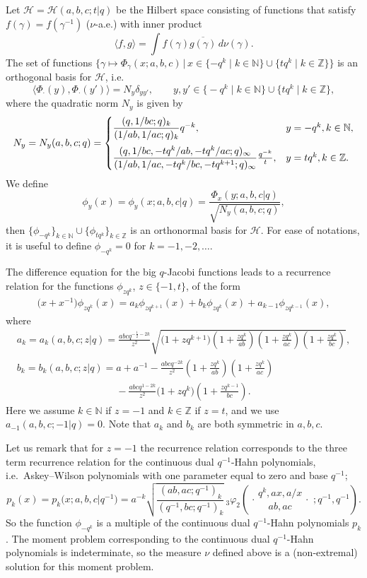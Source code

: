\documentclass[11pt]{article}
\numberwithin{equation}{section}
\numberwithin{theorem}{section}
\numberwithin{proposition}{section}
\numberwithin{lemma}{section}
\numberwithin{corollary}{section}
\numberwithin{definition}{section}
\numberwithin{example}{section}
\numberwithin{remark}{section}
\numberwithin{note}{section}
\newcommand{\N}{\mathbb N}
\newcommand{\Z}{\mathbb Z}
\newcommand{\rphis}[5]{\,_{#1}\varphi_{#2} \left( \genfrac{.}{.}{0pt}{}{#3}{#4}
\ ;#5 \right)}
\begin{document}
Let $\mathcal H=\mathcal H(a,b,c;t|q)$ be the Hilbert space consisting of functions that satisfy $f(\gamma)=f(\gamma^{-1})$ ($\nu$-a.e.) with inner product
\[
\langle f ,g \rangle = \int f(\gamma) \overline{g(\gamma)}\, d\nu(\gamma).
\]
The set of functions $\{\gamma \mapsto \Phi_\gamma(x;a,b,c)\, | \, x \in \{-q^k\mid k \in \N\}\cup\{tq^k\mid k \in \Z \}\}$ is an orthogonal basis for $\mathcal H$, i.e.
\[
\langle \Phi_\cdot(y), \Phi_\cdot(y') \rangle = N_y \delta_{yy'}, \qquad y,y' \in \big\{{-}q^k\mid k \in \N\big\}\cup\big\{tq^k \mid k \in \Z\big\},
\]
where the quadratic norm $N_y$ is given by
\[
N_y =N_y(a,b,c;q)= \begin{cases}
 \dfrac{ (q,1/bc;q)_k }{(1/ab,1/ac;q)_k}q^{-k}, & y=-q^k, k \in \N ,\vspace{2mm}\\
 \dfrac{ (q,1/bc,-tq^k/ab, -tq^k/ac;q)_\infty }{ (1/ab,1/ac,-tq^k/bc, -tq^{k+1};q)_\infty }\frac{q^{-k}}{t}, & y=tq^k, k \in \Z.
\end{cases}
\]
We def\/ine
\[
\phi_y(x)=\phi_y(x;a,b,c|q) = \frac{\Phi_x(y;a,b,c|q)}{\sqrt{N_y(a,b,c;q)}},
\]
then $\{ \phi_{-q^k} \}_{k \in \N} \cup \{\phi_{tq^k} \}_{k \in \Z}$ is an orthonormal basis for $\mathcal H$. For ease of notations, it is useful to def\/ine $\phi_{-q^k}=0$ for $k=-1,-2,\ldots$.

The dif\/ference equation for the big $q$-Jacobi functions leads to a recurrence relation for the functions $\phi_{zq^k}$, $z\in\{-1,t\}$, of the form
\begin{gather} \label{eq:3termrecphi}
\big(x+x^{-1}\big)\phi_{zq^k}(x) = a_k \phi_{zq^{k+1}}(x) + b_k \phi_{zq^k}(x) + a_{k-1}\phi_{zq^{k-1}}(x),
\end{gather}
where
\begin{gather*}
a_k =a_k(a,b,c;z|q)=  \frac{ abcq^{-\frac12-2k} }{z^2} \sqrt{ \big(1+ zq^{k+1} \big) \left(1+\frac{ zq^k}{ab} \right) \left(1+\frac{zq^k}{ac} \right) \left(1+\frac{zq^k}{bc} \right) },\\
b_k =b_k(a,b,c;z|q)=  a+a^{-1} -\frac{abcq^{-2k}}{z^2}\left( 1+ \frac{zq^k}{ab} \right) \left( 1+ \frac{zq^k}{ac} \right)\\
\phantom{b_k =b_k(a,b,c;z|q)=}{}  -\frac{abcq^{1-2k}}{z^2} \big( 1+zq^k \big) \left( 1+\frac{zq^{k-1}}{bc} \right).
\end{gather*}
Here we assume $k \in \N$ if $z=-1$ and $k \in \Z$ if $z=t$, and we use $a_{-1}(a,b,c;-1|q)=0$. Note that $a_k$ and $b_k$ are both symmetric in $a,b,c$.

Let us remark that for $z=-1$ the recurrence relation corresponds to the three term recurrence relation for the continuous dual $q^{-1}$-Hahn polynomials, i.e.~Askey--Wilson polynomials with one parameter equal to zero and base $q^{-1}$;
\[
p_k(x)=p_k\big(x;a,b,c|q^{-1}\big) = a^{-k} \sqrt{ \frac{(ab,ac;q^{-1})_k}{(q^{-1}, bc;q^{-1})_k} } \rphis{3}{2}{q^{k}, ax, a/x}{ab, ac}{q^{-1}, q^{-1}}.
\]
So the function $\phi_{-q^k}$ is a multiple of the continuous dual $q^{-1}$-Hahn polynomials $p_k$. The moment problem corresponding to the continuous dual $q^{-1}$-Hahn polynomials is indeterminate, so the measure $\nu$ def\/ined above is a (non-extremal) solution for this moment problem.
\end{document}
